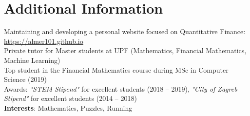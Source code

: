 \documentclass[letterpaper,10pt]{article}
\begin{document}
\section{Additional Information}
\begin{itemize}[leftmargin=0.15in, label={}]
  \small{\item{
  	 Maintaining and developing a personal website focused on Quantitative Finance: \href{https://almer101.github.io/intro.html}{\underline{https://almer101.github.io}} \\ 
  	 Private tutor for Master students at UPF (Mathematics, Financial Mathematics, Machine Learning) \\
     Top student in the Financial Mathematics course during MSc in Computer Science (2019) \\
     Awards: \textit{"STEM Stipend"} for excellent students (2018 -- 2019), \textit{"City of Zagreb Stipend"} for excellent students (2014 -- 2018) \\
     \textbf{Interests}: Mathematics, Puzzles, Running
    }}
\end{itemize}


\end{document}
